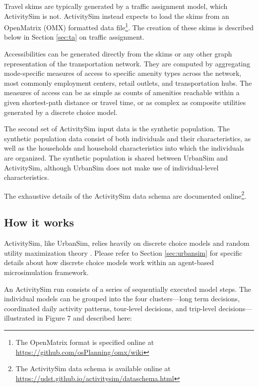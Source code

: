 Travel skims are typically generated by a traffic assignment model, which ActivitySim is not. ActivitySim instead expects to load the skims from an OpenMatrix (OMX) formatted data file\footnote{The OpenMatrix format is specified online at \url{https://github.com/osPlanning/omx/wiki}}. The creation of these skims is described below in Section \ref{sec:ta} on traffic assignment.

Accessibilities can be generated directly from the skims or any other graph representation of the transportation network. They are computed by aggregating mode-specific measures of access to specific amenity types across the network, most commonly employment centers, retail outlets, and transportation hubs. The measures of access can be as simple as counts of amenities reachable within a given shortest-path distance or travel time, or as complex as composite utilities generated by a discrete choice model. 

The second set of ActivitySim input data is the synthetic population. The synthetic population data consist of both individuals and their characteristics, as well as the households and household characteristics into which the individuals are organized. The synthetic population is shared between UrbanSim and ActivitySim, although UrbanSim does not make use of individual-level characteristics. 

The exhaustive details of the ActivitySim data schema are documented online\footnote{The ActivitySim data schema is available online at \url{https://udst.github.io/activitysim/dataschema.html}}.

\subsection{How it works}

ActivitySim, like UrbanSim, relies heavily on discrete choice models and random utility maximization theory \citep{mcfadden-1974}. Please refer to Section \ref{sec:urbansim} for specific details about how discrete choice models work within an agent-based microsimulation framework.

An ActivitySim run consists of a series of sequentially executed model steps. The individual models can be grouped into the four clusters---long term decisions, coordinated daily activity patterns, tour-level decisions, and trip-level decisions---illustrated in Figure 7 and described here:

